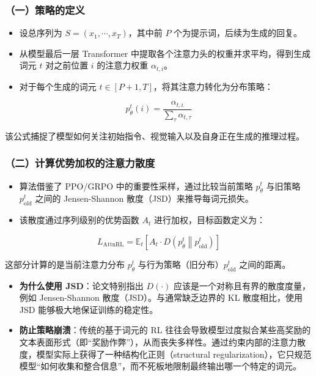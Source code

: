 \hypertarget{ux4e00ux7b56ux7565ux7684ux5b9aux4e49}{%
\subsubsection{（一）策略的定义}\label{ux4e00ux7b56ux7565ux7684ux5b9aux4e49}}

\begin{itemize}
\tightlist
\item
  设总序列为 \(S=(x_1,\cdots,x_T)\)，其中前 \(P\) 个为提示词，后续为生成的回复。
\item
  从模型最后一层 Transformer 中提取各个注意力头的权重并求平均，得到生成词元 \(t\) 对之前位置 \(i\) 的注意力权重 \(\alpha_{t,i}\)。
\item
  对于每个生成的词元 \(t \in [P+1,T]\)，将其注意力转化为分布策略：
\end{itemize}

\[
p_\theta^t(i)=\frac{\alpha_{t,i}}{\sum_{\tau}\alpha_{t,\tau}}
\]

该公式捕捉了模型如何关注初始指令、视觉输入以及自身正在生成的推理过程。

\hypertarget{ux4e8cux8ba1ux7b97ux4f18ux52bfux52a0ux6743ux7684ux6ce8ux610fux529bux6563ux5ea6}{%
\subsubsection{（二）计算优势加权的注意力散度}\label{ux4e8cux8ba1ux7b97ux4f18ux52bfux52a0ux6743ux7684ux6ce8ux610fux529bux6563ux5ea6}}

\begin{itemize}
\tightlist
\item
  算法借鉴了 PPO/GRPO 中的重要性采样，通过比较当前策略 \(p_\theta^t\) 与旧策略 \(p_{\mathrm{old}}^t\) 之间的 Jensen-Shannon 散度（JSD）来推导每词元损失。
\item
  该散度通过序列级别的优势函数 \(A_t\) 进行加权，目标函数定义为：
\end{itemize}

\[
L_{\mathrm{AttnRL}}=\mathbb{E}_t\left[A_t \cdot D\left(p_\theta^t \middle\| p_{\mathrm{old}}^t\right)\right]
\]

这部分计算的是当前注意力分布 \(p_\theta^t\) 与行为策略（旧分布）\(p_{\mathrm{old}}^t\) 之间的距离。

\begin{itemize}
\tightlist
\item
  \textbf{为什么使用 JSD}：论文特别指出 \(D(\cdot)\) 应该是一个对称且有界的散度度量，例如 Jensen-Shannon 散度（JSD）。与通常缺乏边界的 KL 散度相比，使用 JSD 能够极大地保证训练的稳定性。
\item
  \textbf{防止策略崩溃}：传统的基于词元的 RL 往往会导致模型过度拟合某些高奖励的文本表面形式（即``奖励作弊''），从而丧失多样性。通过约束内部的注意力散度，模型实际上获得了一种结构化正则（structural regularization），它只规范模型``如何收集和整合信息''，而不死板地限制最终输出哪一个特定的词元。
\end{itemize}

